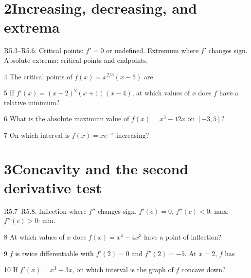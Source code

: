 \documentclass{apcalc}
\begin{document}
\section*{2\quad Increasing, decreasing, and extrema}
\begin{setrule}R5.3–R5.6. Critical points: $f'=0$ or undefined. Extremum where $f'$ changes sign. Absolute extrema: critical points and endpoints.\end{setrule}
\begin{q}{4}
The critical points of $f(x)=x^{2/3}(x-5)$ are
\end{q}
\begin{q}{5}
If $f'(x)=(x-2)^2(x+1)(x-4)$, at which values of $x$ does $f$ have a relative minimum?
\end{q}
\begin{q}{6}
What is the absolute maximum value of $f(x)=x^3-12x$ on $[-3,5]$?
\end{q}
\begin{q}{7}
On which interval is $f(x)=xe^{-x}$ increasing?
\end{q}
\section*{3\quad Concavity and the second derivative test}
\begin{setrule}R5.7–R5.8. Inflection where $f''$ changes sign. $f'(c)=0$, $f''(c)<0$: max; $f''(c)>0$: min.\end{setrule}
\begin{q}{8}
At which values of $x$ does $f(x)=x^4-4x^3$ have a point of inflection?
\end{q}
\begin{q}{9}
$f$ is twice differentiable with $f'(2)=0$ and $f''(2)=-5$. At $x=2$, $f$ has
\end{q}
\begin{q}{10}
If $f'(x)=x^3-3x$, on which interval is the graph of $f$ concave down?
\end{q}
\end{document}
